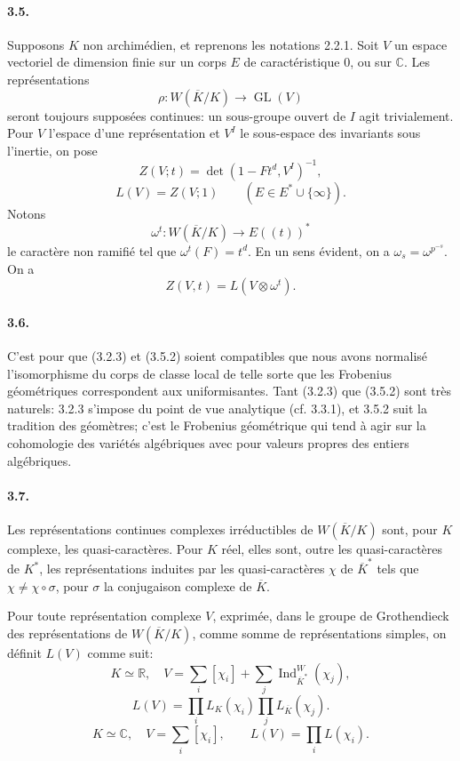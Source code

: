 \documentclass[10pt]{article}
\newcommand{\C}{\mathbb C}
\newcommand{\GL}{\operatorname{GL}}
\newcommand{\Ind}{\operatorname{Ind}}
\providecommand{\R}{\mathbb R}
\begin{document}
\paragraph{3.5.} Supposons \(K\) non archimédien, et reprenons les notations 2.2.1. Soit \(V\) un espace vectoriel de dimension finie sur un corps \(E\) de caractéristique \(0\), ou sur \(\C\). Les représentations
\[
\rho:W(\overline K/K)\longrightarrow\GL(V)
\]
seront toujours supposées continues: un sous-groupe ouvert de \(I\) agit trivialement. Pour \(V\) l'espace d'une représentation et \(V^I\) le sous-espace des invariants sous l'inertie, on pose
\[
\tag{3.5.1}
Z(V;t)=\det(1-Ft^d,V^I)^{-1},
\]
\[
\tag{3.5.2}
L(V)=Z(V;1)\qquad(E\in E^*\cup\{\infty\}).
\]
Notons
\[
\omega^t:W(\overline K/K)\longrightarrow E((t))^*
\]
le caractère non ramifié tel que \(\omega^t(F)=t^d\). En un sens évident, on a \(\omega_s=\omega^{p^{-s}}\). On a
\[
\tag{3.5.3}
Z(V,t)=L(V\otimes\omega^t).
\]

\paragraph{3.6.} C'est pour que (3.2.3) et (3.5.2) soient compatibles que nous avons normalisé l'isomorphisme du corps de classe local de telle sorte que les Frobenius géométriques correspondent aux uniformisantes. Tant (3.2.3) que (3.5.2) sont très naturels: 3.2.3 s'impose du point de vue analytique (cf. 3.3.1), et 3.5.2 suit la tradition des géomètres; c'est le Frobenius géométrique qui tend à agir sur la cohomologie des variétés algébriques avec pour valeurs propres des entiers algébriques.

\paragraph{3.7.} Les représentations continues complexes irréductibles de \(W(\overline K/K)\) sont, pour \(K\) complexe, les quasi-caractères. Pour \(K\) réel, elles sont, outre les quasi-caractères de \(K^*\), les représentations induites par les quasi-caractères \(\chi\) de \(\overline K^*\) tels que \(\chi\ne\chi\circ\sigma\), pour \(\sigma\) la conjugaison complexe de \(\overline K\).

Pour toute représentation complexe \(V\), exprimée, dans le groupe de Grothendieck des représentations de \(W(\overline K/K)\), comme somme de représentations simples, on définit \(L(V)\) comme suit:
\[
\tag{3.7.1}
K\simeq\R,\quad
V=\sum_i[\chi_i]+\sum_j\Ind_{\overline K^*}^{W}(\chi_j),
\]
\[
L(V)=\prod_i L_K(\chi_i)\prod_j L_{\overline K}(\chi_j).
\]
\[
\tag{3.7.2}
K\simeq\C,\quad V=\sum_i[\chi_i],
\qquad
L(V)=\prod_iL(\chi_i).
\]
\end{document}
